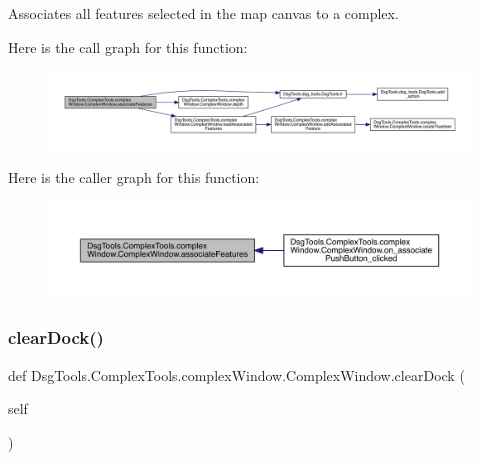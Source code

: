 \begin{DoxyVerb}Associates all features selected in the map canvas to a complex.
\end{DoxyVerb}
 Here is the call graph for this function\+:
\nopagebreak
\begin{figure}[H]
\begin{center}
\leavevmode
\includegraphics[width=350pt]{class_dsg_tools_1_1_complex_tools_1_1complex_window_1_1_complex_window_ad3f85f69aac90814bff6d8c3bf08d3f0_cgraph}
\end{center}
\end{figure}
Here is the caller graph for this function\+:
\nopagebreak
\begin{figure}[H]
\begin{center}
\leavevmode
\includegraphics[width=350pt]{class_dsg_tools_1_1_complex_tools_1_1complex_window_1_1_complex_window_ad3f85f69aac90814bff6d8c3bf08d3f0_icgraph}
\end{center}
\end{figure}
\mbox{\label{class_dsg_tools_1_1_complex_tools_1_1complex_window_1_1_complex_window_a32017933c586a405679d74c6e822132d}} 
\subsubsection{\texorpdfstring{clear\+Dock()}{clearDock()}}
{\footnotesize\ttfamily def Dsg\+Tools.\+Complex\+Tools.\+complex\+Window.\+Complex\+Window.\+clear\+Dock (\begin{DoxyParamCaption}\item[{}]{self }\end{DoxyParamCaption})}

